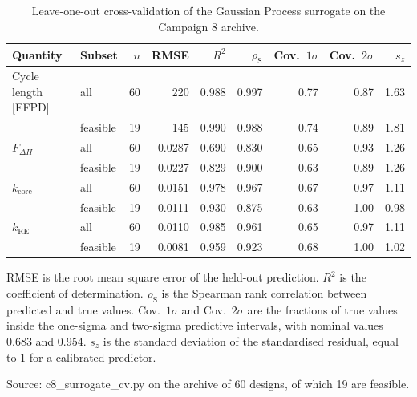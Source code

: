 \begin{table}[htbp]
  \centering
  \begin{threeparttable}
  \caption[Leave-one-out validation of the surrogate]{Leave-one-out cross-validation of the Gaussian Process surrogate on the Campaign 8 archive.}
  \label{tab:c8-cv-loo}
  \begin{tabular}{llrrrrrrr}
    \toprule
    Quantity & Subset & $n$ & RMSE & $R^2$ & $\rho_\mathrm{S}$ & Cov.\ $1\sigma$ & Cov.\ $2\sigma$ & $s_z$ \\
    \midrule
    Cycle length [EFPD] & all & 60 & 220 & 0.988 & 0.997 & 0.77 & 0.87 & 1.63 \\
     & feasible & 19 & 145 & 0.990 & 0.988 & 0.74 & 0.89 & 1.81 \\
    $F_{\Delta H}$ & all & 60 & 0.0287 & 0.690 & 0.830 & 0.65 & 0.93 & 1.26 \\
     & feasible & 19 & 0.0227 & 0.829 & 0.900 & 0.63 & 0.89 & 1.26 \\
    $k_\mathrm{core}$ & all & 60 & 0.0151 & 0.978 & 0.967 & 0.67 & 0.97 & 1.11 \\
     & feasible & 19 & 0.0111 & 0.930 & 0.875 & 0.63 & 1.00 & 0.98 \\
    $k_\mathrm{RE}$ & all & 60 & 0.0110 & 0.985 & 0.961 & 0.65 & 0.97 & 1.11 \\
     & feasible & 19 & 0.0081 & 0.959 & 0.923 & 0.68 & 1.00 & 1.02 \\
    \bottomrule
  \end{tabular}
  \begin{tablenotes}\footnotesize
    \item RMSE is the root mean square error of the held-out prediction. $R^2$ is the coefficient of determination. $\rho_\mathrm{S}$ is the Spearman rank correlation between predicted and true values. Cov.\ $1\sigma$ and Cov.\ $2\sigma$ are the fractions of true values inside the one-sigma and two-sigma predictive intervals, with nominal values 0.683 and 0.954. $s_z$ is the standard deviation of the standardised residual, equal to 1 for a calibrated predictor.
    \item Source: c8\_surrogate\_cv.py on the archive of 60 designs, of which 19 are feasible.
  \end{tablenotes}
  \end{threeparttable}
\end{table}
